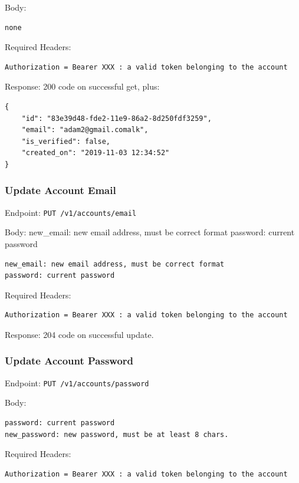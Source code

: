 \documentclass[12pt,openany,a4paper]{book}
\begin{document}
Body:
\begin{verbatim}
none
\end{verbatim}

Required Headers: 

\begin{verbatim}
Authorization = Bearer XXX : a valid token belonging to the account
\end{verbatim}

Response: 200 code on successful get, plus:

\begin{verbatim}
{
	"id": "83e39d48-fde2-11e9-86a2-8d250fdf3259",
	"email": "adam2@gmail.comalk",
	"is_verified": false,
	"created_on": "2019-11-03 12:34:52"
}
\end{verbatim}

\subsubsection{Update Account Email}

Endpoint: \verb|PUT /v1/accounts/email|

Body:
new\_email: new email address, must be correct format
password: current password

\begin{verbatim}
new_email: new email address, must be correct format
password: current password
	\end{verbatim}

Required Headers: 

\begin{verbatim}
Authorization = Bearer XXX : a valid token belonging to the account
\end{verbatim}

Response: 204 code on successful update.

\subsubsection{Update Account Password}

Endpoint: \verb|PUT /v1/accounts/password|

Body:

\begin{verbatim}
password: current password
new_password: new password, must be at least 8 chars.
\end{verbatim}

Required Headers: 

\begin{verbatim}
Authorization = Bearer XXX : a valid token belonging to the account
\end{verbatim}
\end{document}
